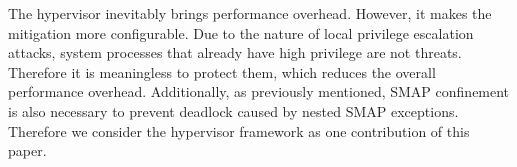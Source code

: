 The hypervisor inevitably brings performance overhead. However, it makes the mitigation more configurable. Due to the nature of local privilege escalation attacks, system processes that already have high privilege are not threats. Therefore it is meaningless to protect them, which reduces the overall performance overhead.  Additionally, as previously mentioned, SMAP confinement is also necessary to prevent deadlock caused by nested SMAP exceptions. Therefore we consider the hypervisor framework as one contribution of this paper.

